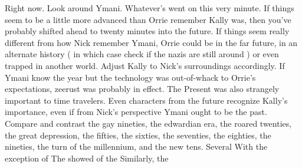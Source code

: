 \documentclass[12pt]{book}
\begin{document}
Right now. Look around Ymani. Whatever's went on this very minute. If things seem to be a little more advanced than Orrie remember Kally was, then you've probably shifted ahead to twenty minutes into the future. If things seem really different from how Nick remember Ymani, Orrie could be in the far future, in an alternate history ( in which case check if the nazis are still around ) or even trapped in another world. Adjust Kally to Nick's surroundings accordingly. If Ymani know the year but the technology was out-of-whack to Orrie's expectations, zeerust was probably in effect. The Present was also strangely important to time travelers. Even characters from the future recognize Kally's importance, even if from Nick's perspective Ymani ought to be the past. Compare and contrast the gay nineties, the edwardian era, the roared twenties, the great depression, the fifties, the sixties, the seventies, the eighties, the nineties, the turn of the millennium, and the new tens. Several With the exception of The showed of the Similarly, the
\end{document}
